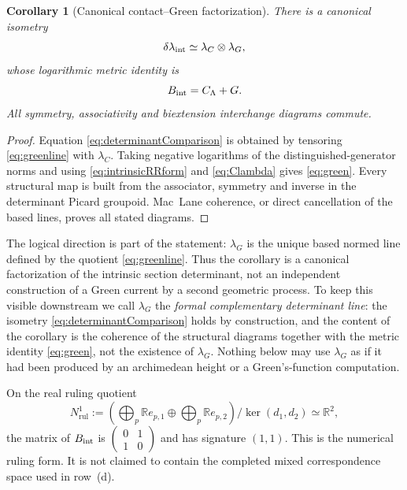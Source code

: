 \documentclass[11pt]{amsart}
\newtheorem{corollary}[theorem]{Corollary}
\theoremstyle{definition}
\theoremstyle{remark}
\newcommand{\R}{\mathbb R}
\begin{document}
\begin{corollary}[Canonical contact--Green factorization]
\label{cor:determinantcomparison}
There is a canonical isometry
\begin{equation}\label{eq:determinantComparison}
 \delta\lambda_{\rm int}
 \simeq\lambda_C\otimes\lambda_G,
\end{equation}
whose logarithmic metric identity is
\begin{equation}\label{eq:green}
 B_{\rm int}=C_\Lambda+G.
\end{equation}
All symmetry, associativity and biextension interchange diagrams commute.
\end{corollary}

\begin{proof}
Equation \eqref{eq:determinantComparison} is obtained by tensoring
\eqref{eq:greenline} with $\lambda_C$.  Taking negative logarithms of the
distinguished-generator norms and using \eqref{eq:intrinsicRRform} and
\eqref{eq:Clambda} gives \eqref{eq:green}.  Every structural map is built
from the associator, symmetry and inverse in the determinant Picard
groupoid.  Mac~Lane coherence, or direct cancellation of the based lines,
proves all stated diagrams.
\end{proof}

The logical direction is part of the statement: $\lambda_G$ is the unique
based normed line defined by the quotient \eqref{eq:greenline}.  Thus the
corollary is a canonical factorization of the intrinsic section determinant,
not an independent construction of a Green current by a second geometric
process.  To keep this visible downstream we call $\lambda_G$ the
\emph{formal complementary determinant line}: the isometry
\eqref{eq:determinantComparison} holds by construction, and the content of
the corollary is the coherence of the structural diagrams together with the
metric identity \eqref{eq:green}, not the existence of $\lambda_G$.  Nothing
below may use $\lambda_G$ as if it had been produced by an archimedean
height or a Green's-function computation.

On the real ruling quotient
\begin{equation}\label{eq:rulingquotient}
 N^1_{\mathrm{rul}}:=
 \left(\bigoplus_p\R e_{p,1}\oplus\bigoplus_p\R e_{p,2}\right)
       /\ker(d_1,d_2)\simeq\R^2,
\end{equation}
the matrix of $B_{\rm int}$ is
$\left(\begin{smallmatrix}0&1\\1&0\end{smallmatrix}\right)$ and has
signature $(1,1)$.  This is the numerical ruling form.  It is not claimed
to contain the completed mixed correspondence space used in row~(d).
\end{document}
